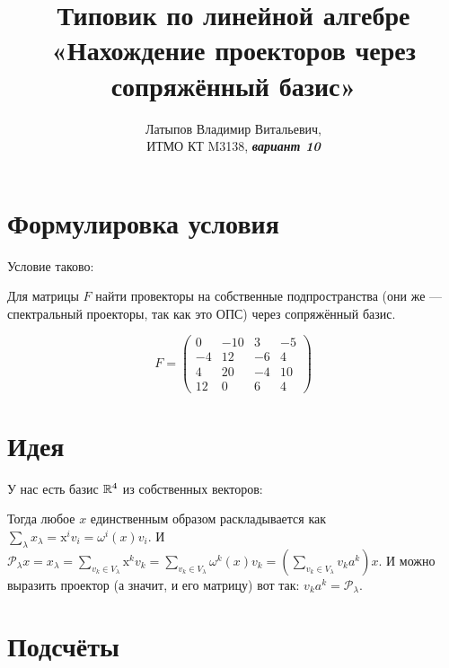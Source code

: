 \documentclass[12pt, a4paper]{article}
\author{Латыпов Владимир Витальевич, \\ ИТМО КТ M3138, \Huge{\textit{\textbf{вариант 10}}}}
\title{Типовик по линейной алгебре «Нахождение проекторов через сопряжённый базис»}
\begin{document}
    \tit

    \section{Формулировка условия}

    \begin{statement}
        Условие таково:

        Для матрицы $F$ найти провекторы на собственные подпространства 
        (они же — спектральный проекторы, так как это ОПС) через сопряжённый базис.

        \begin{equation}
            F = \left(\begin{matrix}
                0 & -10 & 3 & -5 \\
                -4 & 12 & -6 & 4 \\
                4 & 20 & -4 & 10 \\
                12 & 0 & 6 & 4
            \end{matrix}\right)
        \end{equation}

    \end{statement}


    \section{Идея}

    У нас есть базис ${\mathbb{R}}^4$ из собственных векторов:

    Тогда любое $x$ единственным образом раскладывается как $\sum\limits_\lambda x_\lambda=\mathrm x^iv_i=\omega^i(x)v_i$. 
    И $\mathcal{P}_\lambda x=x_\lambda=\sum\limits_{v_k\in V_\lambda}\mathrm x^kv_k=\sum\limits_{v_k\in V_\lambda}\omega^k(x)v_k=\left(\sum\limits_{v_k\in V_\lambda}v_ka^k\right)x$. 
    И можно выразить проектор (а значит, и его матрицу) вот так: $v_ka^k=\mathcal{P}_\lambda$.


    \section{Подсчёты}
\end{document}
